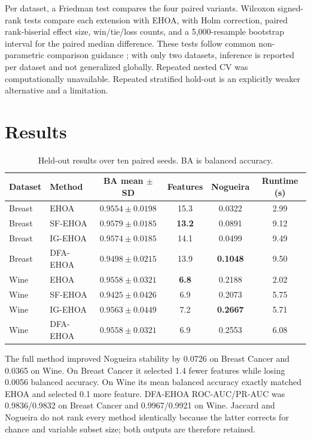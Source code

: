 \documentclass[11pt]{article}
\begin{document}
Per dataset, a Friedman test compares the four paired variants. Wilcoxon
signed-rank tests compare each extension with EHOA, with Holm correction,
paired rank-biserial effect size, win/tie/loss counts, and a 5,000-resample
bootstrap interval for the paired median difference. These tests follow common
non-parametric comparison guidance \cite{demsar2006statistics}; with only two
datasets, inference is reported per dataset and not generalized globally.
Repeated nested CV was computationally unavailable. Repeated stratified
hold-out is an explicitly weaker alternative and a limitation.

\section{Results}
\begin{table}[H]
\centering
\caption{Held-out results over ten paired seeds. BA is balanced accuracy.}
\label{tab:main}
\small
\begin{tabular}{llcccc}
\toprule
Dataset & Method & BA mean $\pm$ SD & Features & Nogueira & Runtime (s)\\
\midrule
Breast & EHOA     & $0.9554\pm0.0198$ & 15.3 & 0.0322 & 2.99\\
Breast & SF-EHOA  & $\mathbf{0.9579}\pm0.0185$ & \textbf{13.2} & 0.0891 & 9.12\\
Breast & IG-EHOA  & $0.9574\pm0.0185$ & 14.1 & 0.0499 & 9.49\\
Breast & DFA-EHOA & $0.9498\pm0.0215$ & 13.9 & \textbf{0.1048} & 9.50\\
\midrule
Wine & EHOA     & $0.9558\pm0.0321$ & \textbf{6.8} & 0.2188 & 2.02\\
Wine & SF-EHOA  & $0.9425\pm0.0426$ & 6.9 & 0.2073 & 5.75\\
Wine & IG-EHOA  & $\mathbf{0.9563}\pm0.0449$ & 7.2 & \textbf{0.2667} & 5.71\\
Wine & DFA-EHOA & $0.9558\pm0.0321$ & 6.9 & 0.2553 & 6.08\\
\bottomrule
\end{tabular}
\end{table}

The full method improved Nogueira stability by 0.0726 on Breast Cancer and
0.0365 on Wine. On Breast Cancer it selected 1.4 fewer features while losing
0.0056 balanced accuracy. On Wine its mean balanced accuracy exactly matched
EHOA and selected 0.1 more feature. DFA-EHOA ROC-AUC/PR-AUC was
0.9836/0.9832 on Breast Cancer and 0.9967/0.9921 on Wine. Jaccard and Nogueira
do not rank every method identically because the latter corrects for chance and
variable subset size; both outputs are therefore retained.
\end{document}
